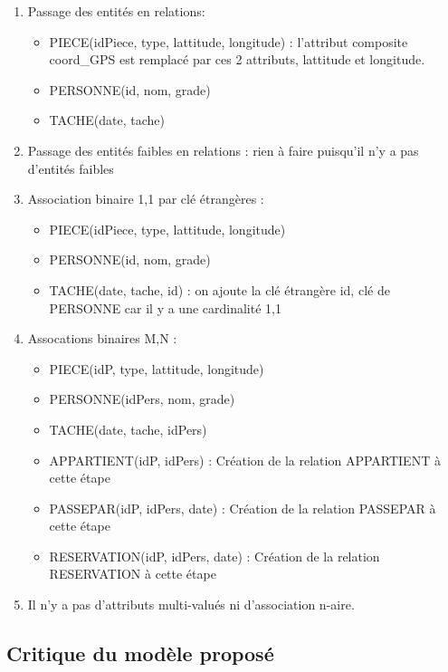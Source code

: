 \begin{enumerate}
	\item Passage des entités en relations:
		\begin{itemize}
			\item PIECE(idPiece, type, lattitude, longitude) : l'attribut composite coord\_GPS est remplacé par ces 2 attributs, lattitude et longitude.
			\item PERSONNE(id, nom, grade)
			\item TACHE(date, tache) 
		\end{itemize}
	\item Passage des entités faibles en relations : rien à faire puisqu'il n'y a pas d'entités faibles
	\item Association binaire 1,1 par clé étrangères :
		\begin{itemize}
			\item PIECE(idPiece, type, lattitude, longitude)
			\item PERSONNE(id, nom, grade)
			\item TACHE(date, tache, id) : on ajoute la clé étrangère id, clé de PERSONNE car il y a une cardinalité 1,1
		\end{itemize}
	\item Assocations binaires M,N :
		\begin{itemize}
			\item PIECE(idP, type, lattitude, longitude)
			\item PERSONNE(idPers, nom, grade)
			\item TACHE(date, tache, idPers)
			\item APPARTIENT(idP, idPers) : Création de la relation APPARTIENT à cette étape
			\item PASSEPAR(idP, idPers, date) : Création de la relation PASSEPAR à cette étape
			\item RESERVATION(idP, idPers, date) : Création de la relation RESERVATION à cette étape
		\end{itemize}
	\item Il n'y a pas d'attributs multi-valués ni d'association n-aire.
\end{enumerate}

\subsection{Critique du modèle proposé}
